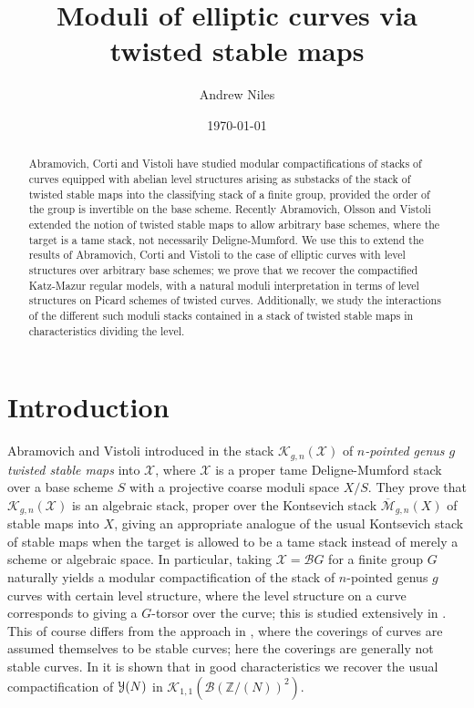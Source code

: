 \documentclass[11pt]{amsart}
\title{Moduli of elliptic curves via twisted stable maps}
\author[A. Niles]{Andrew Niles}
\date{\today}
\theoremstyle{definition}
\begin{document}
\begin{abstract}
Abramovich, Corti and Vistoli have studied modular compactifications of stacks of curves equipped with abelian level structures arising as substacks of the stack of twisted stable maps into the classifying stack of a finite group, provided the order of the group is invertible on the base scheme. Recently Abramovich, Olsson and Vistoli extended the notion of twisted stable maps to allow arbitrary base schemes, where the target is a tame stack, not necessarily Deligne-Mumford. We use this to extend the results of Abramovich, Corti and Vistoli to the case of elliptic curves with level structures over arbitrary base schemes; we prove that we recover the compactified Katz-Mazur regular models, with a natural moduli interpretation in terms of level structures on Picard schemes of twisted curves. Additionally, we study the interactions of the different such moduli stacks contained in a stack of twisted stable maps in characteristics dividing the level.
\end{abstract}

\maketitle
\tableofcontents

\section{Introduction}
Abramovich and Vistoli introduced in \cite{AV} the stack ${\mathcal{K}}_{g,n}({\mathcal{X}})$ of \textit{$n$-pointed genus $g$ twisted stable maps} into ${\mathcal{X}}$, where ${\mathcal{X}}$ is a proper tame Deligne-Mumford stack over a base scheme $S$ with a projective coarse moduli space $X/S$. They prove that ${\mathcal{K}}_{g,n}({\mathcal{X}})$ is an algebraic stack, proper over the Kontsevich stack $\overline{\mathcal{M}}_{g,n}(X)$ of stable maps into $X$, giving an appropriate analogue of the usual Kontsevich stack of stable maps when the target is allowed to be a tame stack instead of merely a scheme or algebraic space. In particular, taking ${\mathcal{X}} = {\mathcal{B}} G$ for a finite group $G$ naturally yields a modular compactification of the stack of $n$-pointed genus $g$ curves with certain level structure, where the level structure on a curve corresponds to giving a $G$-torsor over the curve; this is studied extensively in \cite{ACV}. This of course differs from the approach in \cite{AR}, where the coverings of curves are assumed themselves to be stable curves; here the coverings are generally not stable curves. In \cite{P} it is shown that in good characteristics we recover the usual compactification of ${\mathbf{\EuScript{Y}}}(N)$ in ${\mathcal{K}}_{1,1}({\mathcal{B}}(\mathbb{Z}/(N))^2)$.
\end{document}

